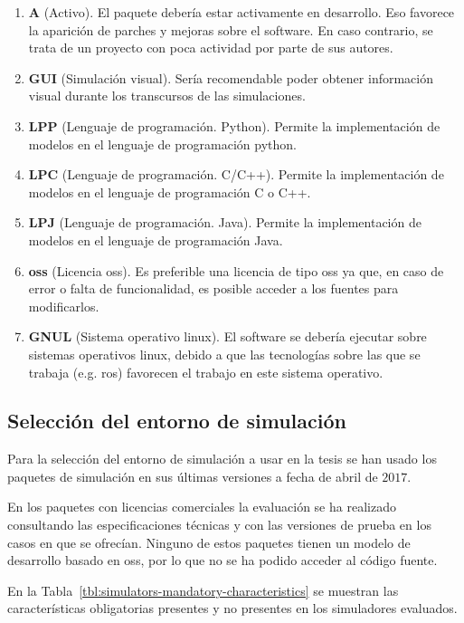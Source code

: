 \begin{enumerate}
	\item \textbf{A} (Activo). El paquete debería estar activamente en desarrollo. Eso favorece la aparición de parches y mejoras sobre el software. En caso contrario, se trata de un proyecto con poca actividad por parte de sus autores.
	\item \textbf{GUI} (Simulación visual). Sería recomendable poder obtener información visual durante los transcursos de las simulaciones.
	\item \textbf{LPP} (Lenguaje de programación. Python). Permite la implementación de modelos en el lenguaje de programación \gls{python}.
	\item \textbf{LPC} (Lenguaje de programación. C/C++). Permite la implementación de modelos en el lenguaje de programación C o C++.
	\item \textbf{LPJ} (Lenguaje de programación. Java). Permite la implementación de modelos en el lenguaje de programación Java.
	\item \textbf{\acrshort{oss}} (Licencia \acrshort{oss}). Es preferible una licencia de tipo \acrfull{oss} ya que, en caso de error o falta de funcionalidad, es posible acceder a los fuentes para modificarlos.
	\item \textbf{GNUL} (Sistema operativo \gls{linux}). El software se debería ejecutar sobre sistemas operativos \gls{linux}, debido a que las tecnologías sobre las que se trabaja (e.g. \acrshort{ros}) favorecen el trabajo en este sistema operativo.
\end{enumerate}

\subsection{Selección del entorno de simulación}

Para la selección del entorno de simulación a usar en la tesis se han usado los paquetes de simulación en sus últimas versiones a fecha de abril de $2017$.

En los paquetes con licencias comerciales la evaluación se ha realizado consultando las especificaciones técnicas y con las versiones de prueba en los casos en que se ofrecían. Ninguno de estos paquetes tienen un modelo de desarrollo basado en \gls{oss}, por lo que no se ha podido acceder al código fuente.

En la Tabla~\ref{tbl:simulators-mandatory-characteristics} se muestran las características obligatorias presentes y no presentes en los simuladores evaluados.

